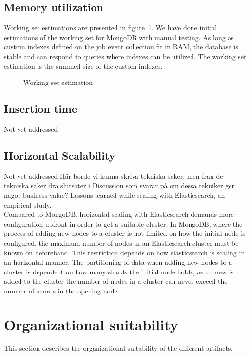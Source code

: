 \subsection{Memory utilization}
Working set estimations are presented in figure~\ref{fig:ws}. We have done initial estimations of the working set for MongoDB with manual testing. As long as custom indexes defined on the job event collection fit in RAM, the database is stable and can respond to queries where indexes can be utilized. The working set estimation is the summed size of the custom indexes.
\begin{figure}[h!]
\centering
{}
\caption{Working set estimation}
\label{fig:ws}
\end{figure}
\subsection{Insertion time}
Not yet addressed
\subsection{Horizontal Scalability}
Not yet addressed
Här borde vi kunna skriva tekniska saker, men från de tekniska saker dra slutsater i Discussion som svarar på om dessa tekniker ger något business value?
Lessons learned while scaling with Elasticsearch, an empirical study.\\
Compared to MongoDB, horizontal scaling with Elasticsearch demands more configuration upfront in order to get a suitable cluster. 
In MongoDB, where the process of adding new nodes to a cluster is not limited on how the initial node is configured, the maximum number of nodes in an Elasticsearch cluster must be known on beforehand. This restriction depends on how elasticsearch is scaling in an horizontal manner. The partitioning of data when adding new nodes to a cluster is dependent on how many shards the initial node holds, as an new is added to the cluster
the number of nodes in a cluster can never exceed the number of shards in the opening node. 

\section{Organizational suitability}
This section describes the organizational suitability of the different artifacts.
